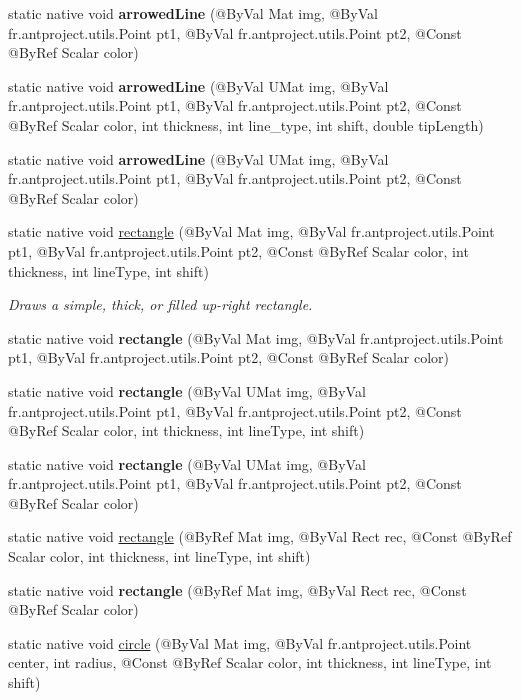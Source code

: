 \begin{DoxyCompactItemize}
static native void {\bfseries arrowed\+Line} (@By\+Val Mat img, @By\+Val fr.antproject.utils.Point pt1, @By\+Val fr.antproject.utils.Point pt2, @Const @By\+Ref Scalar color)
\item 
static native void {\bfseries arrowed\+Line} (@By\+Val U\+Mat img, @By\+Val fr.antproject.utils.Point pt1, @By\+Val fr.antproject.utils.Point pt2, @Const @By\+Ref Scalar color, int thickness, int line\+\_\+type, int shift, double tip\+Length)
\item 
static native void {\bfseries arrowed\+Line} (@By\+Val U\+Mat img, @By\+Val fr.antproject.utils.Point pt1, @By\+Val fr.antproject.utils.Point pt2, @Const @By\+Ref Scalar color)
\item 
static native void \hyperlink{group__imgproc__draw_ga011e780e69d07eab5e5e6ac46d4d8dde}{rectangle} (@By\+Val Mat img, @By\+Val fr.antproject.utils.Point pt1, @By\+Val fr.antproject.utils.Point pt2, @Const @By\+Ref Scalar color, int thickness, int line\+Type, int shift)
\begin{DoxyCompactList}\small\item\em Draws a simple, thick, or filled up-\/right rectangle. \end{DoxyCompactList}\item 
static native void {\bfseries rectangle} (@By\+Val Mat img, @By\+Val fr.antproject.utils.Point pt1, @By\+Val fr.antproject.utils.Point pt2, @Const @By\+Ref Scalar color)
\item 
static native void {\bfseries rectangle} (@By\+Val U\+Mat img, @By\+Val fr.antproject.utils.Point pt1, @By\+Val fr.antproject.utils.Point pt2, @Const @By\+Ref Scalar color, int thickness, int line\+Type, int shift)
\item 
static native void {\bfseries rectangle} (@By\+Val U\+Mat img, @By\+Val fr.antproject.utils.Point pt1, @By\+Val fr.antproject.utils.Point pt2, @Const @By\+Ref Scalar color)
\item 
static native void \hyperlink{group__imgproc__draw_ga35715bd59f4d006c97366b20cdc4499e}{rectangle} (@By\+Ref Mat img, @By\+Val Rect rec, @Const @By\+Ref Scalar color, int thickness, int line\+Type, int shift)
\item 
static native void {\bfseries rectangle} (@By\+Ref Mat img, @By\+Val Rect rec, @Const @By\+Ref Scalar color)
\item 
static native void \hyperlink{group__imgproc__draw_ga6f8e5000cb25b63d5885b12d46f52e39}{circle} (@By\+Val Mat img, @By\+Val fr.antproject.utils.Point center, int radius, @Const @By\+Ref Scalar color, int thickness, int line\+Type, int shift)

\end{DoxyCompactItemize}
